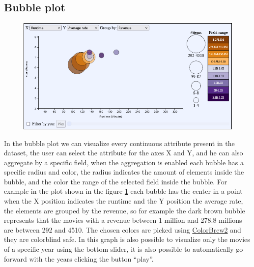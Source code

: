 \documentclass[]{article}
\newcommand{\quotes}[1]{``#1''}
\begin{document}
\subsection{Bubble plot}
\begin{figure}[H]
	\centering
	\includegraphics[width=1\linewidth]{images/bubble_plot}
	\caption[Bubble plot]{}
	\label{fig:bubbleplot}
\end{figure}
In the bubble plot we can visualize every continuous attribute present in the dataset, the user can select the attribute for the axes X and Y, and he can also aggregate by a specific field, when the aggregation is enabled each bubble has a specific radius and color, the radius indicates the amount of elements inside the bubble, and the color the range of the selected field inside the bubble.
For example in the plot shown in the figure \ref{fig:bubbleplot} each bubble has the center in a point when the X position indicates the runtime and the Y position the average rate, the elements are grouped by the revenue, so for example the dark brown bubble represents that the movies with a revenue between 1 million and 278.8 millions are between 292 and 4510.\newline
The chosen colors are picked using \href{https://colorbrewer2.or}{ColorBrew2} and they are colorblind safe.\newline
In this graph is also possible to visualize only the movies of a specific year using the bottom slider, it is also possible to automatically go forward with the years clicking the button \quotes{play}.
\end{document}
